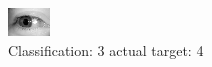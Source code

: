 \begin{figure}[h!]
\begin{center}
\includegraphics[width=0.60\columnwidth]{figures/ID3243_class_3_target_4.png}
\end{center}
\caption{ Classification: 3 actual target: 4}
\label{fig:ID3243_class_3_target_4}
\end{figure}
